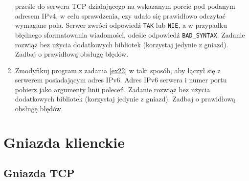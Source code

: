 \documentclass{article}
\begin{document}
\begin{enumerate}[label=\textbf{2.\arabic*}]
 prześle do serwera TCP działającego na wskazanym porcie pod podanym adresem IPv4, w celu sprawdzenia, czy udało się prawidłowo odczytać wymagane pola. Serwer zwróci odpowiedź \texttt{TAK} lub \texttt{NIE}, a w przypadku błędnego sformatowania wiadomości, odeśle odpowiedź \texttt{BAD\_SYNTAX}.  Zadanie rozwiąż bez użycia dodatkowych bibliotek (korzystaj jedynie z gniazd). Zadbaj o prawidłową obsługę błędów. 
 

  \item Zmodyfikuj program z zadania \ref{ex22} w taki sposób,  aby łączył się z serwerem posiadającym adres IPv6.  Adres IPv6 serwera i numer portu pobierz jako argumenty linii poleceń. Zadanie rozwiąż bez użycia dodatkowych bibliotek (korzystaj jedynie z gniazd). Zadbaj o prawidłową obsługę błędów. 

\end{enumerate}

\newpage
\section{Gniazda klienckie}

\subsection*{Gniazda TCP}
\end{document}

